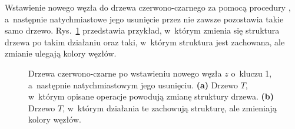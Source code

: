 \exercise %
Wstawienie nowego węzła do drzewa czerwono-czarnego za pomocą procedury , a~następnie natychmiastowe jego usunięcie przez  nie zawsze pozostawia takie samo drzewo.
Rys.\ \ref{fig:13.4-7} przedstawia przykład, w~którym zmienia się struktura drzewa po takim działaniu oraz taki, w~którym struktura jest zachowana, ale zmianie ulegają kolory węzłów.
\begin{figure}[!ht]
	\centering 
	\caption{Drzewa czerwono-czarne po wstawieniu nowego węzła $z$ o~kluczu 1, a~następnie natychmiastowym jego usunięciu.
	{\sffamily\bfseries(a)} Drzewo $T$, w~którym opisane operacje powodują zmianę struktury drzewa.
	{\sffamily\bfseries(b)} Drzewo $T$, w~którym działania te zachowują strukturę, ale zmieniają kolory węzłów.} \label{fig:13.4-7}
\end{figure}
